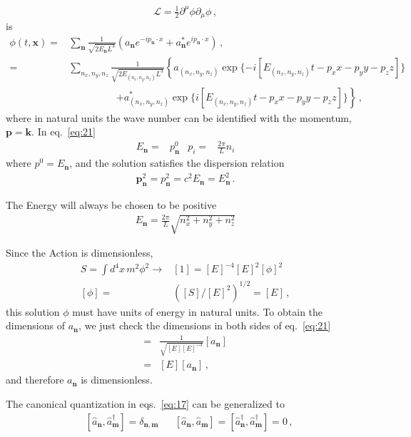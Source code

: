\begin{equation}
  \mathcal{L}=\tfrac{1}{2}\partial^\mu\phi\partial_\mu\phi\,,
\end{equation}
is
\begin{align}
  \label{eq:21}
  \phi(t,\mathbf{x})=&\sum_\mathbf{n}\frac{1}{\sqrt{2E_\mathbf{n} L^3}}
  \left(a_\mathbf{n} e^{-i p_\mathbf{n}\cdot x }+a_\mathbf{n}^* e^{i p_\mathbf{n}\cdot x }\right)\,,\nonumber\\
 =&\sum_{n_x,n_y,n_z}\frac{1}{\sqrt{2E_{(n_x,n_y,n_z)} L^3}}
  \left\{a_{(n_x,n_y,n_z)} \exp\{ -i [E_{(n_x,n_y,n_z)}t-p_{x}x-p_{y}y-p_{z}z] \} \right.\nonumber\\
&\hspace{2cm}\left.+a_{(n_x,n_y,n_z)}^* \exp\{ i[ E_{(n_x,n_y,n_z)}t-p_{x}x-p_{y}y-p_{z}z] \} \right\}\,,
\end{align}
where in natural units the wave number can be identified with the momentum, $\mathbf{p}=\mathbf{k}$. In eq.~\eqref{eq:21}
\begin{align}
  E_{\mathbf{n}}=&p^0_{\mathbf{n}} & p_i=&\frac{2\pi}{L}n_i
\end{align}
where $p^0=E_\mathbf{n}$, and the solution satisfies the dispersion relation 
\begin{align}
  \mathbf{p}_{\mathbf{n}}^2=p_{\mathbf{n}}^2=c^2E_{\mathbf{n}}=E_{\mathbf{n}}^2\,.
\end{align}

The Energy will always be chosen to be positive
\begin{align}
  E_{\mathbf{n}}=\frac{2\pi}{L}\sqrt{n_x^2+n_y^2+n_z^2}
\end{align}

Since the Action is dimensionless, 
\begin{align}
  S=\int d^4x\, m^2\phi^2\to& [1]=[E]^{-4}[E]^2[\phi]^2\nonumber\\
  [\phi]=&([S]/[E]^{2})^{1/2}=[E]\,,
\end{align}
this solution $\phi$  must have units of energy in natural units.
To obtain the dimensions of $a_{\mathbf{n}}$, we just check the dimensions in both sides of eq.~\eqref{eq:21}
\begin{align}
  [E]=&\frac{1}{\sqrt{[E][E]^{-3}}}[a_{\mathbf{n}}]\nonumber\\
  =&[E][a_{\mathbf{n}}]\,,
\end{align}
and therefore  $a_{\mathbf{n}}$ is dimensionless.

The canonical quantization in eqs.~\eqref{eq:17}  can be  generalized to 
\begin{align}
  &\left[\widehat{a}_\mathbf{n},\widehat{a}_\mathbf{m}^\dagger\right]=
\delta_{\mathbf{n},\mathbf{m}}&
&\left[\widehat{a}_\mathbf{n},\widehat{a}_\mathbf{m}\right]=
\left[\widehat{a}_\mathbf{n}^\dagger,\widehat{a}_\mathbf{m}^\dagger\right]=0\,,
\end{align}
